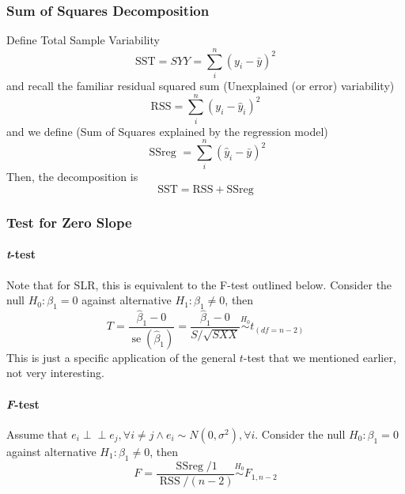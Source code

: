 \documentclass[11pt]{article}
\newcommand{\independent}{\perp \!\!\! \perp}
\begin{document}
\subsubsection{Sum of Squares Decomposition}
Define \color{Thistle} Total Sample Variability \color{Black}
\begin{equation*}
    \mathrm{SST}=S Y Y=\sum_{i}^{n}\left(y_{i}-\bar{y}\right)^{2}
\end{equation*}
and recall the familiar residual squared sum \color{Thistle} (Unexplained (or error) variability) \color{Black}
\begin{equation*}
    \mathrm{RSS}=\sum_{i}^{n}\left(y_{i}-\hat{y}_{i}\right)^{2}
\end{equation*}
and we define \color{Thistle}(Sum of Squares explained by the regression model) \color{Black}
\begin{equation*}
    \text { SSreg }=\sum_{i}^{n}\left(\hat{y}_{i}-\bar{y}\right)^{2}
\end{equation*}
Then, the decomposition is
\begin{equation*}
    \text{SST} = \mathrm{RSS} + \text {SSreg}
\end{equation*}

\subsubsection{Test for Zero Slope}
\paragraph{\textit{t}-test} Note that for SLR, this is equivalent to the F-test outlined below. Consider the null $H_0: \beta_1 = 0$ against alternative $H_1: \beta_1 \neq 0$, then
\begin{equation*}
    T=\frac{\hat{\beta}_{1}-0}{\operatorname{se}\left(\hat{\beta}_{1}\right)} = \frac{\hat{\beta}_{1}- 0}{S / \sqrt{S X X}} \overset{H_0}{\sim} t_{(df = n-2)} 
\end{equation*}
This is just a specific application of the general $t$-test that we mentioned earlier, not very interesting. 

\paragraph{\textit{F}-test}
Assume that $e_i\independent e_j, \forall i\neq j \land e_i\sim N(0, \sigma^2), \forall i$. Consider the null $H_0: \beta_1 = 0$ against alternative $H_1: \beta_1 \neq 0$, then
\begin{equation*}
    F=\frac{\operatorname{SSreg} / 1}{\operatorname{RSS} /(n-2)} \overset{H_0}{\sim} F_{1, n-2}
\end{equation*}
\end{document}
